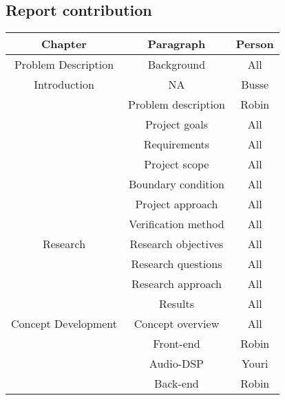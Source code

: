 \begin{justify}


\newpage
\tableofcontents
\thispagestyle{empty}

\listoffigures
\thispagestyle{empty}

\listoftables
\thispagestyle{empty}

\newpage
\pagestyle{plain}

\chapter*{Report contribution}	%
\begin{table}[!h]
	\centering
\begin{tabular}{|c|c|c|}
		\hline
\textbf{Chapter} & \textbf{Paragraph} & \textbf{Person} \\ \hline
Problem Description			& Background					& All	 			\\ \hline
Introduction				& NA							& Busse 			\\ \hline
							& Problem description			& Robin				\\ \hline
							& Project goals					& All				\\ \hline
							& Requirements					& All 				\\ \hline
							& Project scope					& All 				\\ \hline
							& Boundary condition			& All				\\ \hline
							& Project approach				& All				\\ \hline
							& Verification method			& All				\\ \hline
Research 					& Research objectives			& All 				\\ \hline
							& Research questions			& All 				\\ \hline
							& Research approach				& All 				\\ \hline
							& Results						& All 				\\ \hline
Concept Development 		& Concept overview				& All				\\ \hline
							& Front-end						& Robin				\\ \hline
							& Audio-DSP						& Youri				\\ \hline
							& Back-end						& Robin				\\ \hline

\end{tabular}
\end{table}
\end{justify}
